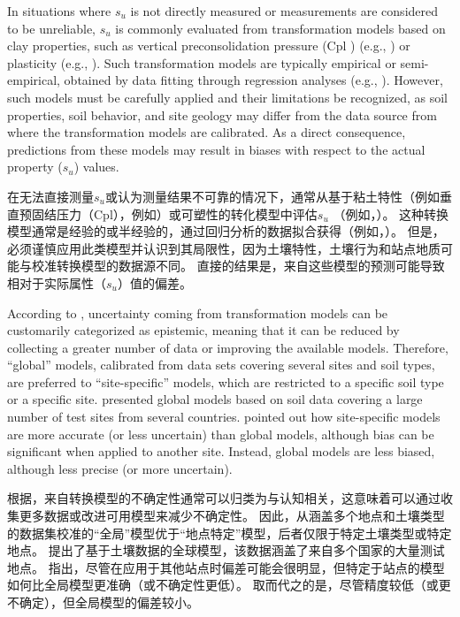 \begin{paracol}{2}
    \switchcolumn*

    In situations where $s_u$ is not directly measured or measurements are considered to be unreliable, $s_u$ is commonly evaluated from transformation  models  based  on  clay  properties,  such  as vertical preconsolidation pressure (Cpl ) (e.g., \citealt{Mesri1975409,Jamiolkowski198557}) or plasticity (e.g., \citealt{Hansbo1957,Chandler198813}). Such transformation models are typically empirical or semi-empirical, obtained by data ﬁtting through regression analyses (e.g., \citealt{Kulhawy1990}). However, such models must be carefully applied and their limitations be recognized, as soil properties, soil behavior, and site geology may differ from the data source from where the transformation models are calibrated. As a direct consequence, predictions from these models may result in biases with respect to the actual property ($s_u$) values.

    \switchcolumn

    在无法直接测量$s_u$或认为测量结果不可靠的情况下，通常从基于粘土特性（例如垂直预固结压力（Cpl），例如\citealt{Mesri1975409,Jamiolkowski198557}）或可塑性的转化模型中评估$s_u$ （例如，\citealt{Hansbo1957,Chandler198813}）。 这种转换模型通常是经验的或半经验的，通过回归分析的数据拟合获得（例如，\citealt{Kulhawy1990}）。 但是，必须谨慎应用此类模型并认识到其局限性，因为土壤特性，土壤行为和站点地质可能与校准转换模型的数据源不同。 直接的结果是，来自这些模型的预测可能导致相对于实际属性（$s_u$）值的偏差。

    \switchcolumn*

    According to \citet{Phoon1999612}, uncertainty coming from transformation models can be customarily categorized as epistemic, meaning that it can be reduced by collecting a greater number of data or improving the available models. Therefore, “global” models, calibrated from data sets covering several sites and soil types, are preferred to “site-speciﬁc” models, which are restricted to a speciﬁc soil type or a speciﬁc site. \citet{Ching201252, Ching2012522, Ching2014663, Ching2014686} presented global models based on soil data covering a large number of test sites from several countries. \citet{Ching201252} pointed out how site-speciﬁc models are more accurate (or less uncertain) than global models, although bias can be signiﬁcant when applied to another site. Instead, global models are less biased, although less precise (or more uncertain).

    \switchcolumn

    根据\citet{Phoon1999612}，来自转换模型的不确定性通常可以归类为与认知相关，这意味着可以通过收集更多数据或改进可用模型来减少不确定性。 因此，从涵盖多个地点和土壤类型的数据集校准的“全局”模型优于“地点特定”模型，后者仅限于特定土壤类型或特定地点。 \citet{Ching201252, Ching2012522, Ching2014663, Ching2014686}提出了基于土壤数据的全球模型，该数据涵盖了来自多个国家的大量测试地点。 \citet{Ching201252}指出，尽管在应用于其他站点时偏差可能会很明显，但特定于站点的模型如何比全局模型更准确（或不确定性更低）。 取而代之的是，尽管精度较低（或更不确定），但全局模型的偏差较小。


\end{paracol}
